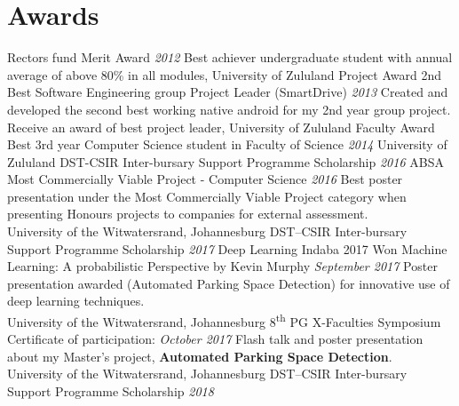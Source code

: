 \documentclass[letterpaper]{moderncv}        %
\begin{document}
\section{Awards}
\cventry
{Rector\textquotesingle{}s fund}
{Merit Award}
{}
{\textit{2012}}
{}
{Best achiever undergraduate student with annual average of above 80\% in all modules, University of Zululand}
\vspace{1mm}
\cventry
{Project Award}
{2nd Best Software Engineering group Project Leader (SmartDrive)}
{}
{\textit{2013}}
{}
{Created and developed the second best working native android for my 2nd year group project. Receive an award of best project leader, University of Zululand}
\vspace{1mm}
\cventry
{Faculty Award}
{Best 3rd year Computer Science student in Faculty of Science}
{}
{\textit{2014}}
{}
{University of Zululand}
\vspace{1mm}
\cventry
{DST-CSIR}
{Inter-bursary Support Programme Scholarship}
{}
{\textit{2016}}
{}
{}
\vspace{1mm}
\cventry
{ABSA}
{Most Commercially Viable Project - Computer Science}
{}
{\textit{2016}}
{}
{Best poster presentation under the Most Commercially Viable Project category when presenting Honours projects to companies for external assessment.\\University of the Witwatersrand, Johannesburg}
\vspace{1mm}
\cventry
{DST–CSIR}
{Inter-bursary Support Programme Scholarship}
{}
{\textit{2017}}
{}
{}
\vspace{1mm}
\cventry
{Deep Learning Indaba 2017}
{Won \textquotesingle{}Machine Learning: A probabilistic Perspective by Kevin Murphy\textquotesingle{}}
{}
{\textit{September 2017}}
{}
{Poster presentation awarded (Automated Parking Space Detection) for innovative use of deep learning techniques.\\University of the Witwatersrand, Johannesburg}
\vspace{1mm}
\cventry
{8\textsuperscript{th} PG X-Faculties Symposium}
{Certificate of participation:}
{}
{\textit{October 2017}}
{}
{Flash talk and poster presentation about my Master's project, \textbf{Automated Parking Space Detection}.\\University of the Witwatersrand, Johannesburg}
\vspace{1mm}
\cventry
{DST–CSIR}
{Inter-bursary Support Programme Scholarship}
{}
{\textit{2018}}
{}
{}
\vspace{1mm}

\end{document}
